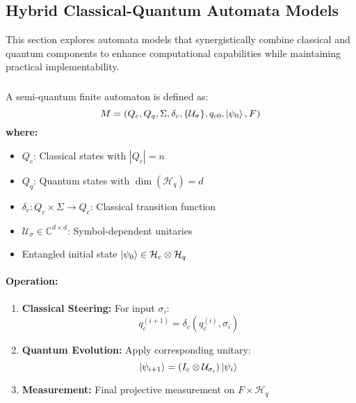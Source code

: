 \subsection{Hybrid Classical-Quantum Automata Models}
\label{sec:hybrid-qfa}

This section explores automata models that synergistically combine classical and quantum components to enhance computational capabilities while maintaining practical implementability.

\subsubsection{}
\label{subsec:sqa}

\begin{definition}
A semi-quantum finite automaton is defined as:
\[
M = (Q_c, Q_q, \Sigma, \delta_c, \{\mathcal{U}_\sigma\}, q_{c0}, \ket{\psi_0}, F)
\]
\textbf{where:}
\begin{itemize}
    \item $Q_c$: Classical states with $|Q_c| = n$
    \item $Q_q$: Quantum states with $\dim(\mathcal{H}_q) = d$
    \item $\delta_c: Q_c \times \Sigma \rightarrow Q_c$: Classical transition function
    \item $\mathcal{U}_\sigma \in \mathbb{C}^{d \times d}$: Symbol-dependent unitaries
    \item Entangled initial state $\ket{\psi_0} \in \mathcal{H}_c \otimes \mathcal{H}_q$
\end{itemize}
\end{definition}

\paragraph{Operation:}
\begin{enumerate}
    \item \textbf{Classical Steering:} For input $\sigma_i$:
    \[
    q_c^{(i+1)} = \delta_c(q_c^{(i)}, \sigma_i)
    \]
    \item \textbf{Quantum Evolution:} Apply corresponding unitary:
    \[
    \ket{\psi_{i+1}} = (I_c \otimes \mathcal{U}_{\sigma_i}) \ket{\psi_i}
    \]
    \item \textbf{Measurement:} Final projective measurement on $F \times \mathcal{H}_q$
\end{enumerate}

